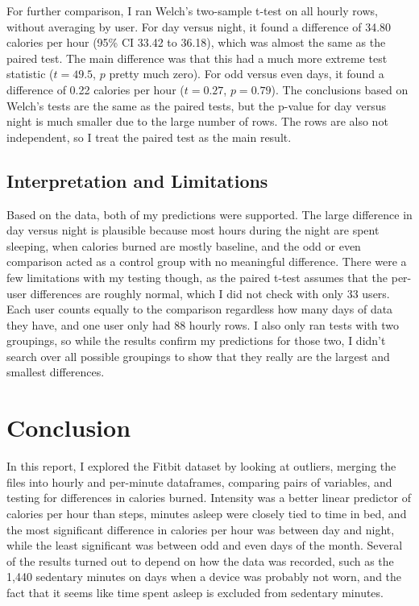 \documentclass[11pt]{article}
\begin{document}
For further comparison, I ran Welch's two-sample t-test on all hourly rows, without averaging by user.
For day versus night, it found a difference of 34.80 calories per hour (95\% CI 33.42 to 36.18), which was almost the same as the paired test.
The main difference was that this had a much more extreme test statistic ($t = 49.5$, $p$ pretty much zero).
For odd versus even days, it found a difference of 0.22 calories per hour ($t = 0.27$, $p = 0.79$).
The conclusions based on Welch's tests are the same as the paired tests, but the p-value for day versus night is much smaller due to the large number of rows.
The rows are also not independent, so I treat the paired test as the main result.

\subsection{Interpretation and Limitations}

Based on the data, both of my predictions were supported.
The large difference in day versus night is plausible because most hours during the night are spent sleeping, when calories burned are mostly baseline, and the odd or even comparison acted as a control group with no meaningful difference.
There were a few limitations with my testing though, as the paired t-test assumes that the per-user differences are roughly normal, which I did not check with only 33 users.
Each user counts equally to the comparison regardless how many days of data they have, and one user only had 88 hourly rows.
I also only ran tests with two groupings, so while the results confirm my predictions for those two, I didn't search over all possible groupings to show that they really are the largest and smallest differences.

\section*{Conclusion}

In this report, I explored the Fitbit dataset by looking at outliers, merging the files into hourly and per-minute dataframes, comparing pairs of variables, and testing for differences in calories burned.
Intensity was a better linear predictor of calories per hour than steps, minutes asleep were closely tied to time in bed, and the most significant difference in calories per hour was between day and night, while the least significant was between odd and even days of the month.
Several of the results turned out to depend on how the data was recorded, such as the 1,440 sedentary minutes on days when a device was probably not worn, and the fact that it seems like time spent asleep is excluded from sedentary minutes.
\end{document}

